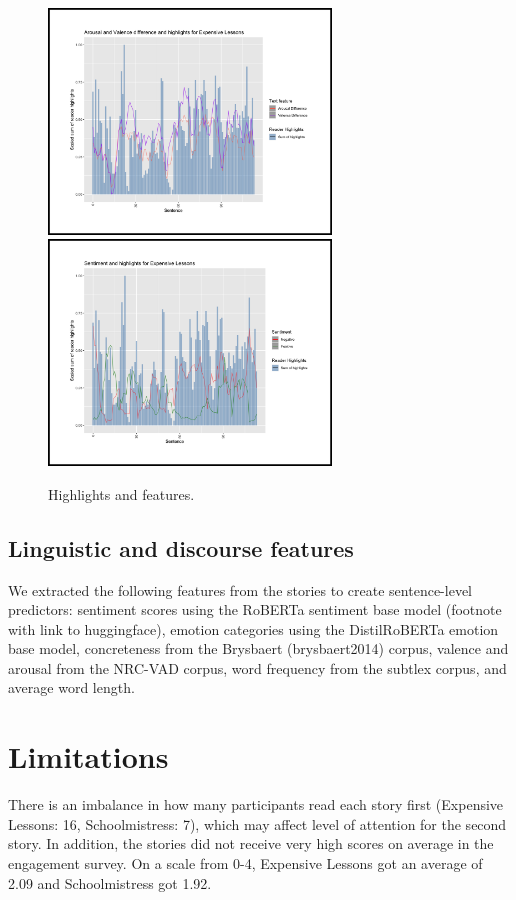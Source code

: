 \documentclass[11pt]{article}
\begin{document}
\begin{figure}
  \includegraphics[height=6cm]{el_highlights_val_arousal}
  \includegraphics[height=6cm]{el_highlights_sentiment}
  \caption{Highlights and features.}
\end{figure}

\subsection{Linguistic and discourse features}

We extracted the following features from the stories to create sentence-level predictors: sentiment scores using the RoBERTa sentiment base model (footnote with link to huggingface), emotion categories using the DistilRoBERTa emotion base model, concreteness from the Brysbaert (brysbaert2014) corpus, valence and arousal from the NRC-VAD corpus, word frequency from the subtlex corpus, and average word length.

\section{Limitations}

There is an imbalance in how many participants read each story first (Expensive Lessons: 16, Schoolmistress: 7), which may affect level of attention for the second story. In addition, the stories did not receive very high scores on average in the engagement survey. On a scale from 0-4, Expensive Lessons got an average of 2.09 and Schoolmistress got 1.92.
\end{document}
